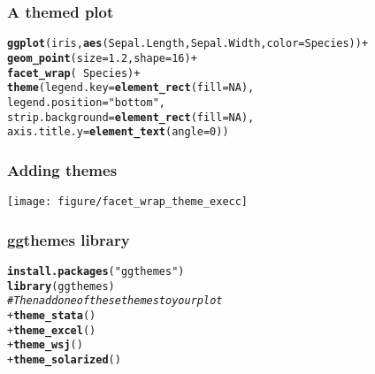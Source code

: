 \documentclass{beamer}\usepackage[]{graphicx}\usepackage[]{color}
\makeatletter
\newcommand{\hlstr}[1]{\textcolor[rgb]{0.192,0.494,0.8}{#1}}%
\newcommand{\hlcom}[1]{\textcolor[rgb]{0.678,0.584,0.686}{\textit{#1}}}%
\newcommand{\hlkwd}[1]{\textcolor[rgb]{0.737,0.353,0.396}{\textbf{#1}}}%
\newenvironment{kframe}{%
 \def\at@end@of@kframe{}%
 \ifinner\ifhmode%
  \def\at@end@of@kframe{\end{minipage}}%
  \begin{minipage}{\columnwidth}%
 \fi\fi%
 \def\FrameCommand##1{\hskip\@totalleftmargin \hskip-\fboxsep
 \colorbox{shadecolor}{##1}\hskip-\fboxsep
     \hskip-\linewidth \hskip-\@totalleftmargin \hskip\columnwidth}%
 \MakeFramed {\advance\hsize-\width
   \@totalleftmargin\z@ \linewidth\hsize
   \@setminipage}}%
 {\par\unskip\endMakeFramed%
 \at@end@of@kframe}
\newenvironment{knitrout}{}{} %
\makeatother
\begin{document}
\begin{frame}[fragile]
\frametitle{A themed plot}
\begin{knitrout}\footnotesize
{}\color{fgcolor}\begin{kframe}
\begin{alltt}
\hlkwd{ggplot}(iris, \hlkwd{aes}(Sepal.Length, Sepal.Width, color = Species)) +
\hlkwd{geom_point}(size = 1.2, shape = 16) +
\hlkwd{facet_wrap}( ~ Species) +
\hlkwd{theme}(legend.key = \hlkwd{element_rect}(fill = NA),
legend.position = \hlstr{"bottom"},
strip.background = \hlkwd{element_rect}(fill = NA),
axis.title.y = \hlkwd{element_text}(angle = 0))
\end{alltt}
\end{kframe}
\end{knitrout}

\end{frame}

\begin{frame}[fragile]
\frametitle{Adding themes}
\begin{knitrout}\footnotesize
{}\color{fgcolor}
\texttt{[image: figure/facet\_wrap\_theme\_execc]} 

\end{knitrout}

\end{frame}

\begin{frame}[fragile]
\frametitle{ggthemes library}
\begin{knitrout}\footnotesize
{}\color{fgcolor}\begin{kframe}
\begin{alltt}
\hlkwd{install.packages}(\hlstr{"ggthemes"})
\hlkwd{library}(ggthemes)
\hlcom{# Then add one of these themes to your plot}
+\hlkwd{theme_stata}()
+\hlkwd{theme_excel}()
+\hlkwd{theme_wsj}()
+\hlkwd{theme_solarized}()
\end{alltt}
\end{kframe}
\end{knitrout}

\end{frame}


\end{document}

